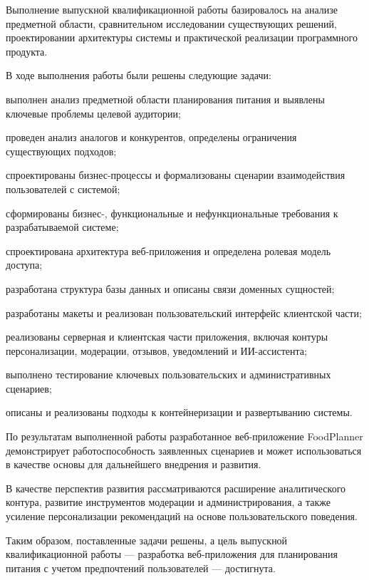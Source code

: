 \Conclusion %

Выполнение выпускной квалификационной работы базировалось на анализе предметной области, сравнительном исследовании существующих решений, проектировании архитектуры системы и практической реализации программного продукта.

В ходе выполнения работы были решены следующие задачи:
\begin{compactlist}
  \item выполнен анализ предметной области планирования питания и выявлены ключевые проблемы целевой аудитории;
  \item проведен анализ аналогов и конкурентов, определены ограничения существующих подходов;
  \item спроектированы бизнес-процессы и формализованы сценарии взаимодействия пользователей с системой;
  \item сформированы бизнес-, функциональные и нефункциональные требования к разрабатываемой системе;
  \item спроектирована архитектура веб-приложения и определена ролевая модель доступа;
  \item разработана структура базы данных и описаны связи доменных сущностей;
  \item разработаны макеты и реализован пользовательский интерфейс клиентской части;
  \item реализованы серверная и клиентская части приложения, включая контуры персонализации, модерации, отзывов, уведомлений и ИИ-ассистента;
  \item выполнено тестирование ключевых пользовательских и административных сценариев;
  \item описаны и реализованы подходы к контейнеризации и развертыванию системы.
\end{compactlist}

По результатам выполненной работы разработанное веб-приложение FoodPlanner демонстрирует работоспособность заявленных сценариев и может использоваться в качестве основы для дальнейшего внедрения и развития.

В качестве перспектив развития рассматриваются расширение аналитического контура, развитие инструментов модерации и администрирования, а также усиление персонализации рекомендаций на основе пользовательского поведения.

Таким образом, поставленные задачи решены, а цель выпускной квалификационной работы --- разработка веб-приложения для планирования питания с учетом предпочтений пользователей --- достигнута.

